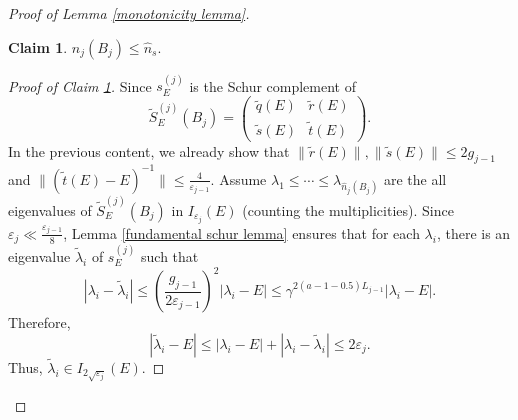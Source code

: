\documentclass[11pt,reqno,UTF8,twoside]{amsart}
\newcommand{\ts}{\tilde{s}}
\newcommand{\tr}{\tilde{r}}
\renewcommand{\tt}{\tilde{t}}
\newcommand{\whn}{\widehat{n}}
\newcommand{\wtlambda}{\widetilde{\lambda}}
\newcommand{\wtSj}{\widetilde{S}^{(j)}}
\newcommand{\smallSj}{s^{(j)}}
\theoremstyle{definition}
\newtheorem{claim}[thm]{\bf Claim}
\numberwithin{equation}{section}
\begin{document}
\begin{proof}[Proof of Lemma \ref{monotonicity lemma}]
\begin{claim}\label{intermediate comparison claim 2}
  $\whn_{j}(B_j) \leq \whn_s$.
\end{claim}
\begin{proof}[Proof of  Claim \ref{intermediate comparison claim 2}]
  Since $\smallSj_E$ is the Schur complement of
  \begin{equation*}
    \wtSj_{E} (B_{j}) = \begin{pmatrix}
\tilde{q}(E) & \tilde{r}(E) \\
\tilde{s}(E) & \tilde{t}(E)
\end{pmatrix}.
  \end{equation*}
  In the previous content, we already show that $\| \tr(E)\|,\| \ts(E)\|\leq 2g_{j-1} $ and $\|(\tt(E)-E)^{-1} \| \leq \frac{4}{\varepsilon_{j-1}}$. 
  Assume $\lambda_1 \leq \cdots\leq \lambda_{\whn_j(B_j)}$ are the   all eigenvalues  of $\wtSj_E(B_j)$ in $I_{\varepsilon_j}(E)$ (counting the multiplicities).
  Since $\varepsilon_j \ll \frac{\varepsilon_{j-1}}{8}$, Lemma \ref{fundamental schur lemma} ensures that for each $\lambda_i$, there is an  eigenvalue $\wtlambda_i$ of $\smallSj_E$ such that 
  \[|\lambda_i-\wtlambda_i|\leq (\frac{g_{j-1}}{2\varepsilon_{j-1}})^2 |\lambda_i-E|\leq \gamma^{2(a-1-0.5)L_{j-1}} |\lambda_i-E|.\]
  Therefore,
  \[|\wtlambda_i-E|\leq |\lambda_i-E|+|\lambda_i-\wtlambda_i|\leq 2\varepsilon_j .\]
  Thus, $\wtlambda_i \in I_{2\sqrt{\varepsilon_j}}(E) $. 


\end{proof}
\end{proof}
\end{document}
